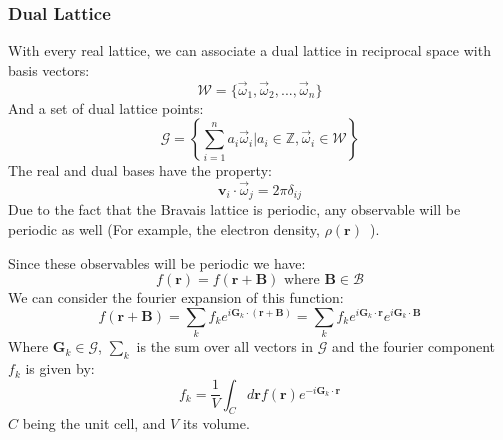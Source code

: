 \documentclass[12pt]{article}
\begin{document}
\subsubsection{Dual Lattice}
With every real lattice, we can associate a dual lattice in reciprocal space with basis vectors:
\begin{equation}\label{eq:dual_basis}
	\mathcal{W} = \{\vec{\omega}_1, \vec \omega _2, ..., \vec{\omega}_n\}
\end{equation}
And a set of dual lattice points:
\begin{equation}\label{eq:dual_lattice}
	\mathcal{G} = \left \{\sum_{i=1}^n a_i\vec{\omega}_i \Big | a_i \in \mathbb{Z}, \vec{\omega}_i \in \mathcal{W}  \right \}
\end{equation}
The real and dual bases have the property:
\begin{equation}
	\mathbf v _ i \cdot \vec\omega_j = 2\pi\delta_{ij}
\end{equation}
Due to the fact that the Bravais lattice is periodic, any observable will be periodic as well (For example, the electron density, $\rho(\mathbf{r})$\ ).

Since these observables will be periodic we have:
\begin{equation}\label{eq:periodic_observable}
	f(\mathbf r) = f(\mathbf r + \mathbf B) \text{ where } \mathbf B \in \mathcal B
\end{equation}
We can consider the fourier expansion of this function:
\begin{equation}\label{eq:f_fourier_expansion}
	f(\mathbf r + \mathbf B) = \sum_k f_k e ^ {i \mathbf G_k\cdot(\mathbf r + \mathbf B)} 
	= \sum _k f_k e ^ {i \mathbf G_k \cdot \mathbf r} e ^ {i \mathbf G_k \cdot \mathbf B}
\end{equation}
Where $\mathbf G_k \in \mathcal G$, $\sum_k$ is the sum over all vectors in $\mathcal G$ and the fourier component $f_k$ is given by:
\begin{equation}
	f_k = \frac{1}{V}\int_Cd\mathbf rf(\mathbf r)e^{-i\mathbf G_k\cdot \mathbf r}
\end{equation}
$C$ being the unit cell, and $V$ its volume.
\end{document}

